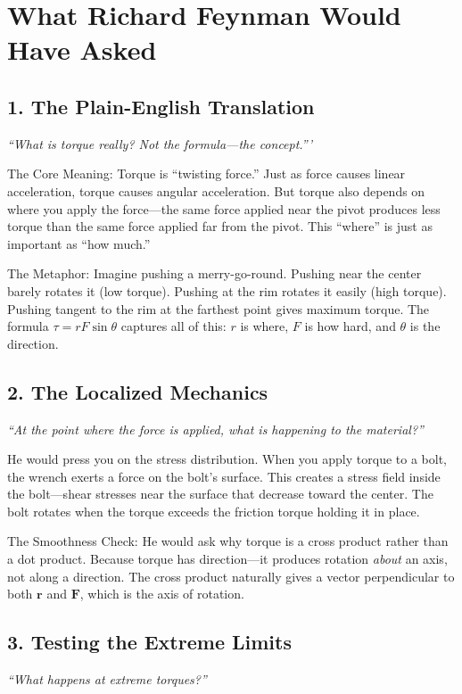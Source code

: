 \documentclass[11pt,openright]{book}
\begin{document}
\section*{What Richard Feynman Would Have Asked}

\subsection*{1. The Plain-English Translation}
\textit{``What is torque really? Not the formula---the concept.'''}

The Core Meaning: Torque is ``twisting force.'' Just as force causes linear acceleration, torque causes angular acceleration. But torque also depends on where you apply the force---the same force applied near the pivot produces less torque than the same force applied far from the pivot. This ``where'' is just as important as ``how much.''

The Metaphor: Imagine pushing a merry-go-round. Pushing near the center barely rotates it (low torque). Pushing at the rim rotates it easily (high torque). Pushing tangent to the rim at the farthest point gives maximum torque. The formula $\tau = rF\sin\theta$ captures all of this: $r$ is where, $F$ is how hard, and $\theta$ is the direction.

\subsection*{2. The Localized Mechanics}
\textit{``At the point where the force is applied, what is happening to the material?''}

He would press you on the stress distribution. When you apply torque to a bolt, the wrench exerts a force on the bolt's surface. This creates a stress field inside the bolt---shear stresses near the surface that decrease toward the center. The bolt rotates when the torque exceeds the friction torque holding it in place.

The Smoothness Check: He would ask why torque is a cross product rather than a dot product. Because torque has direction---it produces rotation \emph{about} an axis, not along a direction. The cross product naturally gives a vector perpendicular to both $\mathbf{r}$ and $\mathbf{F}$, which is the axis of rotation.

\subsection*{3. Testing the Extreme Limits}
\textit{``What happens at extreme torques?''}
\end{document}

